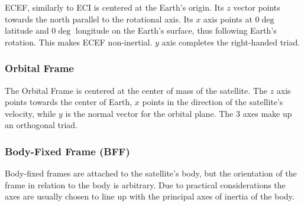 ECEF, similarly to ECI is centered at the Earth's origin. Its $z$ vector points towards the north parallel to the rotational axis. Its $x$ axis points at $0\deg$ latitude and $0\deg$ longitude on the Earth's surface, thus following Earth's rotation. This makes ECEF non-inertial. $y$ axis completes the right-handed triad.

\subsubsection{Orbital Frame}

The Orbital Frame is centered at the center of mass of the satellite. The $z$ axis points towards the center of Earth, $x$ points in the direction of the satellite's velocity, while $y$ is the normal vector for the orbital plane. The 3 axes make up an orthogonal triad.


\subsubsection{Body-Fixed Frame (BFF)}

Body-fixed frames are attached to the satellite's body, but the orientation of the frame in relation to the body is arbitrary. Due to practical considerations the axes are usually chosen to line up with the principal axes of inertia of the body.

